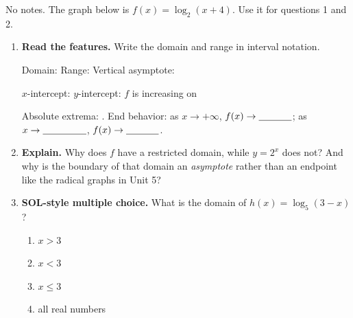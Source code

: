 \documentclass[10pt]{article}
\newcommand{\lgrid}[4]{%
  \draw[step=1, linegray!40, very thin] (#1,#3) grid (#2,#4);
  \draw[->, semithick, charcoal] (#1,0)--(#2,0) node[below right, font=\scriptsize]{$x$};
  \draw[->, semithick, charcoal] (0,#3)--(0,#4) node[left, font=\scriptsize]{$y$};}
\newcommand{\logcurve}[5]{\draw[very thick, forest, domain=#4:#5, samples=120, smooth]
  plot ({pow(#1,\x-(#3))+(#2)},{\x});}
\begin{document}
\namedateperiod

\vspace{0.08in}

No notes. The graph below is $f(x) = \log_2(x+4)$. Use it for questions 1 and 2.
\begin{center}
\end{center}

\begin{enumerate}[leftmargin=1.8em, itemsep=8pt]
  \item \textbf{Read the features.} Write the domain and range in interval notation.

        Domain: \blank{3.2cm} \quad Range: \blank{3.2cm} \quad Vertical asymptote: \blank{2.0cm}

        \vspace{3pt}
        $x$-intercept: \blank{1.8cm} \quad $y$-intercept: \blank{1.8cm} \quad
        $f$ is increasing on \blank{2.6cm}

        \vspace{3pt}
        Absolute extrema: \blank{2.0cm}. \quad End behavior: as $x\to+\infty$,
        $f(x)\to\blank{1.2cm}$; \; as $x\to\blank{1.6cm}$, $f(x)\to\blank{1.2cm}$.

  \item \textbf{Explain.} Why does $f$ have a restricted domain, while $y=2^{x}$ does not?
        And why is the boundary of that domain an \emph{asymptote} rather than an endpoint like the
        radical graphs in Unit 5?

  \item \textbf{SOL-style multiple choice.} What is the domain of $h(x) = \log_5(3-x)$?
        \begin{enumerate}[label=\Alph*., leftmargin=1.9em, itemsep=1pt]
          \item $x > 3$
          \item $x < 3$
          \item $x \le 3$
          \item all real numbers
        \end{enumerate}
\end{enumerate}
\end{document}
